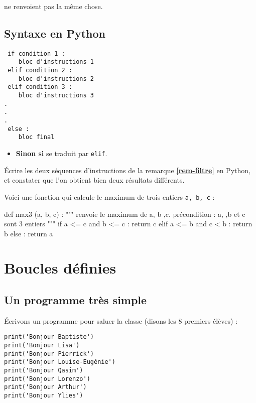 \begin{rem}
\begin{itemize}
ne renvoient pas la même chose.

\end{itemize}
\end{rem}

\subsection{Syntaxe en Python}

\begin{lstlisting}
 if condition 1 :
	bloc d'instructions 1
 elif condition 2 :
	bloc d'instructions 2
 elif condition 3 :
	bloc d'instructions 3
.
.
.
 else :
	bloc final
\end{lstlisting}

\begin{itemize}
 \item \textbf{Sinon si} se traduit par \texttt{elif}. 
\end{itemize}

Écrire les deux séquences d'instructions de la remarque \textbf{\ref{rem-filtre}} en Python, et 
constater que l'on obtient bien deux résultats différents.

Voici une fonction qui calcule le maximum de trois entiers \texttt{a, b, c} :
\begin{pyverbatim}
def max3 (a, b, c) :
    """ renvoie le maximum de a, b ,c.
    précondition : a, ,b et c sont 3 entiers """
    if a <= c and b <= c :
        return c
    elif a <= b and c < b :
        return b
    else :
        return a
\end{pyverbatim}



\section{Boucles définies}

\subsection{Un programme très simple}

Écrivons un programme pour saluer la classe (disons les 8 premiers
élèves) :
\begin{lstlisting}
print('Bonjour Baptiste')
print('Bonjour Lisa')
print('Bonjour Pierrick')
print('Bonjour Louise-Eugénie')
print('Bonjour Qasim')
print('Bonjour Lorenzo')
print('Bonjour Arthur')
print('Bonjour Ylies')
\end{lstlisting}

